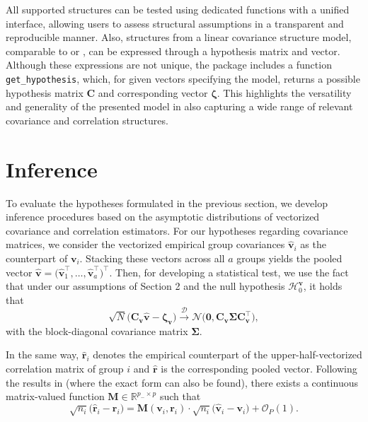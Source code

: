 All supported structures can be tested using dedicated functions with a unified
interface, allowing users to assess structural assumptions in a transparent and
reproducible manner. Also, structures from a linear covariance structure model,
comparable to \citet{anderson1973} or \citet{szatrowski1980}, can be
expressed through a hypothesis matrix and vector. Although these expressions are
not unique, the package includes a function \texttt{get\_hypothesis}, which, for
given vectors specifying the model, returns a possible hypothesis matrix \(\boldsymbol{C}\)
and corresponding vector \(\boldsymbol{\zeta}\).
This highlights the versatility and generality of the presented model in also capturing a wide range of relevant
covariance and correlation structures.

\section{Inference}\label{inference}

To evaluate the hypotheses formulated in the previous section, we develop
inference procedures based on the asymptotic distributions of vectorized
covariance and correlation estimators. For our hypotheses regarding covariance
matrices, we consider the vectorized empirical group covariances
\(\widehat{\boldsymbol{v}}_i\) as the counterpart of \(\boldsymbol{v}_i\). Stacking
these vectors across all \(a\) groups yields the pooled vector
\(\widehat{\boldsymbol{v}}=\bigl(
\widehat{\boldsymbol{v}}_1^\top, \dots,
\widehat{\boldsymbol{v}}_a^\top
\bigr)^\top.\) Then, for developing a statistical test, we use the fact that under our
assumptions of Section 2 and the null hypothesis
\(\mathcal{H}_0^{\boldsymbol{v}}\), it holds that
\begin{equation}
\sqrt{N}
\bigl(
\boldsymbol{C}_{\boldsymbol{v}} \widehat{\boldsymbol{v}}
- \boldsymbol{\zeta}_{\boldsymbol{v}}
\bigr)
\stackrel{\mathcal D}{\longrightarrow}
\mathcal{N}
\bigl(
\mathbf{0},
\boldsymbol{C}_{\boldsymbol{v}} \boldsymbol{\Sigma} \boldsymbol{C}_{\boldsymbol{v}}^\top
\bigr),
\label{eq:cov-limit}
\end{equation}
with the block-diagonal covariance matrix \(\boldsymbol{\Sigma}\).

In the same way, \(\widehat{\boldsymbol{r}}_i\) denotes the empirical counterpart
of the upper-half-vectorized correlation matrix of group \(i\) and
\(\widehat{\boldsymbol{r}}\) is the corresponding pooled vector. Following the
results in \citet{sattler2023} (where the exact form can also be found), there
exists a continuous matrix-valued function
\(\boldsymbol{M} \in \mathbb{R}^{p_- \times p}\) such that
\begin{equation}
\sqrt{n_i}
\bigl(
\widehat{\boldsymbol{r}}_i - \boldsymbol{r}_i
\bigr)
=
\boldsymbol{M}(\boldsymbol{v}_i, \boldsymbol{r}_i)
\cdot
\sqrt{n_i}
\bigl(
\widehat{\boldsymbol{v}}_i - \boldsymbol{v}_i
\bigr)
+ {\scriptstyle \mathcal{O}_P(1)}.
\label{eq:relation}
\end{equation}

